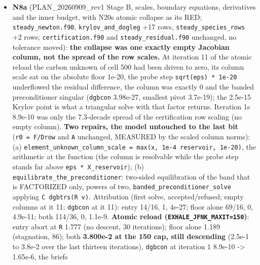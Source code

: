 \documentclass[english,a4paper]{my_memo}
\begin{document}
\begin{itemize}
  owes the next \texttt{Reconstruct} an \texttt{Apply\_BC} (same family as N16d, a
  diagnostic route); \texttt{err\_atol\ =\ 1e-12} still floors the conservative rows
  on a code-unit density; the mass/momentum inner error is still unbounded
  (the deciding row\textquotesingle s interval is a point); no fixture has the species
  class deciding a step, so the exponent switch is covered by unit rows
  only.
\item
  \textbf{N8a} (PLAN\_20260909\_rev1 Stage B, scales, boundary equations,
  derivatives and the inner budget, with N20\textquotesingle s atomic collapse as its RED;
  \texttt{steady\_newton.f90}, \texttt{krylov\_and\_dogleg} +17 rows, \texttt{steady\_species\_rows}
  +2 rows; \texttt{certification.f90} and \texttt{steady\_residual.f90} unchanged, no
  tolerance moved): \textbf{the collapse was one exactly empty Jacobian column,
  not the spread of the row scales.} At iteration 11 of the atomic reload
  the carbon unknown of cell 500 had been driven to zero, its column scale
  sat on the absolute floor 1e-20, the probe step \texttt{sqrt(eps)\ *\ 1e-20}
  underflowed the residual difference, the column was exactly 0 and the
  banded preconditioner singular (\texttt{dgbcon} 3.98e-27, smallest pivot
  3.7e-19); the 2.5e-15 Krylov point is what a triangular solve with that
  factor returns. Iteration 1\textquotesingle s 8.9e-10 was only the 7.3-decade spread of
  the certification row scaling (no empty column). \textbf{Two repairs, the model
  untouched to the last bit} (\texttt{r0\ =\ F/Drow} and \texttt{A} unchanged, MEASURED by
  the scaled column norms): (a) \texttt{element\_unknown\_column\_scale\ =\ max(\textbar{}x\textbar{},\ 1e-4\ \textbar{}reservoir\textbar{},\ 1e-20)}, the arithmetic at the function (the column is
  resolvable while the probe step stands far above \texttt{eps\ *\ X\_reservoir});
  (b) \texttt{equilibrate\_the\_preconditioner}: two-sided equilibration of the band
  that is FACTORIZED only, powers of two, \texttt{banded\_preconditioner\_solve}
  applying \texttt{C\ dgbtrs(R\ v)}. Attribution (first solve, accepted/refused;
  empty columns at it 11; \texttt{dgbcon} at it 11): entry 14/16, 1, 4e-27; floor
  alone 69/16, 0, 4.9e-11; both 114/36, 0, 1.1e-9. \textbf{Atomic reload
  (\texttt{EXHALE\_JFNK\_MAXIT=150})}: entry abort at \texttt{\textbar{}\textbar{}R\textbar{}\textbar{}} 1.777 (no descent, 30
  iterations); floor alone 1.189 (stagnation, 86); both \textbf{3.800e-2 at the
  150 cap, still descending} (2.5e-1 to 3.8e-2 over the last thirteen
  iterations), \texttt{dgbcon} at iteration 1 8.9e-10 -\textgreater{} 1.65e-6, the brief\textquotesingle s

\end{itemize}
\end{document}
